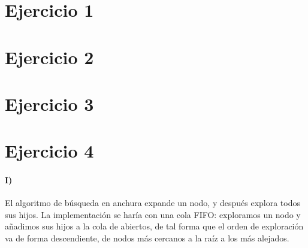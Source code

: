 \documentclass{aitemplate}
\begin{document}

\section*{Ejercicio 1}

%
\newpage

%
%
%
\newpage

\section*{Ejercicio 2}

%
\newpage

\newpage

\newpage

\section*{Ejercicio 3}

\newpage

\newpage

\newpage

\newpage

\newpage

\newpage
%

\section*{Ejercicio 4}

\paragraph*{I)} El algoritmo de búsqueda en anchura expande un nodo, y después explora todos sus hijos. La implementación se haría con una cola FIFO: exploramos un nodo y añadimos sus hijos a la cola de abiertos, de tal forma que el orden de exploración va de forma descendiente, de nodos más cercanos a la raíz a los más alejados.

\
\end{document}
